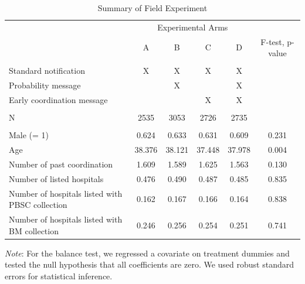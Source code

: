 \documentclass[12pt, a4paper]{article}
\begin{document}
\begin{table}

\caption{\label{tab:summary}Summary of Field Experiment}
\centering
\fontsize{9}{11}\selectfont
\begin{threeparttable}
\begin{tabular}[t]{lccccc}
\toprule
\multicolumn{1}{c}{ } & \multicolumn{4}{c}{Experimental Arms} & \multicolumn{1}{c}{ } \\
\cmidrule(l{3pt}r{3pt}){2-5}
 & A & B & C & D & F-test, p-value\\
\midrule
\addlinespace[0.3em]
\multicolumn{6}{l}{\textbf{A. Interventions}}\\
\hspace{1em}Standard notification & X & X & X & X & \\
\hspace{1em}Probability message &  & X &  & X & \\
\hspace{1em}Early coordination message &  &  & X & X & \\
\addlinespace[0.3em]
\multicolumn{6}{l}{\textbf{B. Sample Size}}\\
\hspace{1em}N & 2535 & 3053 & 2726 & 2735 & \\
\addlinespace[0.3em]
\multicolumn{6}{l}{\textbf{C. Balance Test}}\\
\hspace{1em}Male (= 1) & 0.624 & 0.633 & 0.631 & 0.609 & 0.231\\
\hspace{1em}Age & 38.376 & 38.121 & 37.448 & 37.978 & 0.004\\
\hspace{1em}Number of past coordination & 1.609 & 1.589 & 1.625 & 1.563 & 0.130\\
\hspace{1em}Number of listed hospitals & 0.476 & 0.490 & 0.487 & 0.485 & 0.835\\
\hspace{1em}Number of hospitals listed with PBSC collection & 0.162 & 0.167 & 0.166 & 0.164 & 0.838\\
\hspace{1em}Number of hospitals listed with BM collection & 0.246 & 0.256 & 0.254 & 0.251 & 0.741\\
\bottomrule
\end{tabular}
\begin{tablenotes}
\item \emph{Note}: For the balance test, we regressed a covariate on treatment dummies and tested the null hypothesis that all coefficients are zero. We used robust standard errors for statistical inference.
\end{tablenotes}
\end{threeparttable}
\end{table}
\end{document}
